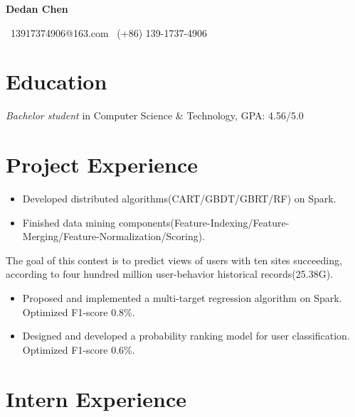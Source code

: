 \documentclass{resume}
\begin{document}

\centerline{\huge \bf Dedan Chen}
\vspace{2ex}

\centerline{\small \faEnvelope~13917374906@163.com \quad \faPhone~(+86) 139-1737-4906}


\vspace{1ex}

\section{\bf Education}

\textit{Bachelor student} in Computer Science \& Technology, GPA: 4.56/5.0

\section{\bf Project Experience}

\begin{itemize}
  \item  Developed distributed algorithms(CART/GBDT/GBRT/RF) on Spark.
  \item Finished data mining components(Feature-Indexing/Feature-Merging/Feature-Normalization/Scoring).
\end{itemize}

The goal of this contest is to predict views of users with ten sites succeeding, according to four hundred million user-behavior historical records(25.38G).
\begin{itemize}
  \item Proposed and implemented a multi-target regression algorithm on Spark. Optimized F1-score 0.8\%.
  \item Designed and developed a probability ranking model for user classification. Optimized F1-score  0.6\%.
\end{itemize}

\section{\bf Intern Experience}
\end{document}
